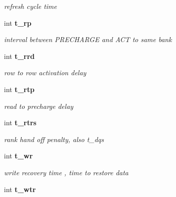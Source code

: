 \begin{DoxyCompactItemize}
\begin{DoxyCompactList}\small\item\em refresh cycle time \item\end{DoxyCompactList}\item 
int {\bf t\_\-rp}\label{class_d_r_a_msim_i_i_1_1_timing_specification_a7b4991ee22075889f88512d5b3c3e07e}

\begin{DoxyCompactList}\small\item\em interval between PRECHARGE and ACT to same bank \item\end{DoxyCompactList}\item 
int {\bf t\_\-rrd}\label{class_d_r_a_msim_i_i_1_1_timing_specification_ae686c75e601392cb7bd0d7b38f680861}

\begin{DoxyCompactList}\small\item\em row to row activation delay \item\end{DoxyCompactList}\item 
int {\bf t\_\-rtp}\label{class_d_r_a_msim_i_i_1_1_timing_specification_af7e7bf9631df259ab4353a9df4acba39}

\begin{DoxyCompactList}\small\item\em read to precharge delay \item\end{DoxyCompactList}\item 
int {\bf t\_\-rtrs}\label{class_d_r_a_msim_i_i_1_1_timing_specification_af1987bd7569873f4ae6d7e848badab43}

\begin{DoxyCompactList}\small\item\em rank hand off penalty, also t\_\-dqs \item\end{DoxyCompactList}\item 
int {\bf t\_\-wr}\label{class_d_r_a_msim_i_i_1_1_timing_specification_a145ae8d7a81753949886d4015a7a44de}

\begin{DoxyCompactList}\small\item\em write recovery time , time to restore data \item\end{DoxyCompactList}\item 
int {\bf t\_\-wtr}\label{class_d_r_a_msim_i_i_1_1_timing_specification_a394dae9ddb5e304ff07d709c09c00e6a}


\end{DoxyCompactItemize}
